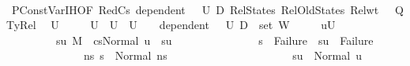 \begin{isabellebody}
\isanewline
\ \ \isamarkupfalse%
\ PConstVar{\isachardot}{\kern0pt}IH{\isacharbrackleft}{\kern0pt}OF\ RedCs{}\ {\isacartoucheopen}dependent\ {\isasymLambda}{\isacharprime}{\kern0pt}\ {\isasymOmega}\ U{}\ D{}{\isacartoucheclose}\ RelStates\ RelOldStates\ Rel{\isacharunderscore}{\kern0pt}wt\ {\isacharunderscore}{\kern0pt}\ {\isacharunderscore}{\kern0pt}\ QTyRel{\isacharbrackright}{\kern0pt}\ \isamarkupfalse%
\ U{}\ \isanewline
\ \ \ \ {\isachardoublequoteopen}U{}\ {\isasymsubseteq}\ U{}{\isachardoublequoteclose}\ \ {\isachardoublequoteopen}U{}\ {\isasymnoteq}\ {\isacharbraceleft}{\kern0pt}{\isacharbraceright}{\kern0pt}{\isachardoublequoteclose}\ \ {\isachardoublequoteopen}dependent\ {\isasymLambda}{\isacharprime}{\kern0pt}\ {\isasymOmega}\ U{}\ {\isacharparenleft}{\kern0pt}D{}\ {\isasymunion}\ set\ W{\isacharparenright}{\kern0pt}{\isachardoublequoteclose}\ \isanewline
\ \ \ \ {\isachardoublequoteopen}{\isacharparenleft}{\kern0pt}{\isasymforall}u{\isasymin}U{}{\isachardot}{\kern0pt}\isanewline
\ \ \ \ \ \ \ \ \ {\isasymexists}su{\isachardot}{\kern0pt}\ {\isacharparenleft}{\kern0pt}M{\isacharcomma}{\kern0pt}{\isasymLambda}{\isacharprime}{\kern0pt}{\isacharcomma}{\kern0pt}{\isasymGamma}{\isacharcomma}{\kern0pt}{\isasymOmega}\ {\isasymturnstile}\ {\isasymlangle}cs{}{\isacharcomma}{\kern0pt}Normal\ u{\isasymrangle}\ {\isacharbrackleft}{\kern0pt}{\isasymrightarrow}{\isacharbrackright}{\kern0pt}\ su{\isacharparenright}{\kern0pt}\ {\isasymand}\isanewline
\ \ \ \ \ \ \ \ \ \ \ \ \ \ {\isacharparenleft}{\kern0pt}s{\isacharprime}{\kern0pt}\ {\isacharequal}{\kern0pt}\ Failure\ {\isasymlongrightarrow}\ su\ {\isacharequal}{\kern0pt}\ Failure{\isacharparenright}{\kern0pt}\ {\isasymand}\isanewline
\ \ \ \ \ \ \ \ \ \ \ \ \ \ {\isacharparenleft}{\kern0pt}{\isasymforall}ns{\isacharprime}{\kern0pt}{\isachardot}{\kern0pt}\ s{\isacharprime}{\kern0pt}\ {\isacharequal}{\kern0pt}\ Normal\ ns{\isacharprime}{\kern0pt}\ {\isasymlongrightarrow}\isanewline
\ \ \ \ \ \ \ \ \ \ \ \ \ \ \ \ \ \ \ \ \ su\ {\isacharequal}{\kern0pt}\ Normal\ u\ {\isasymand}\isanewline

\end{isabellebody}

